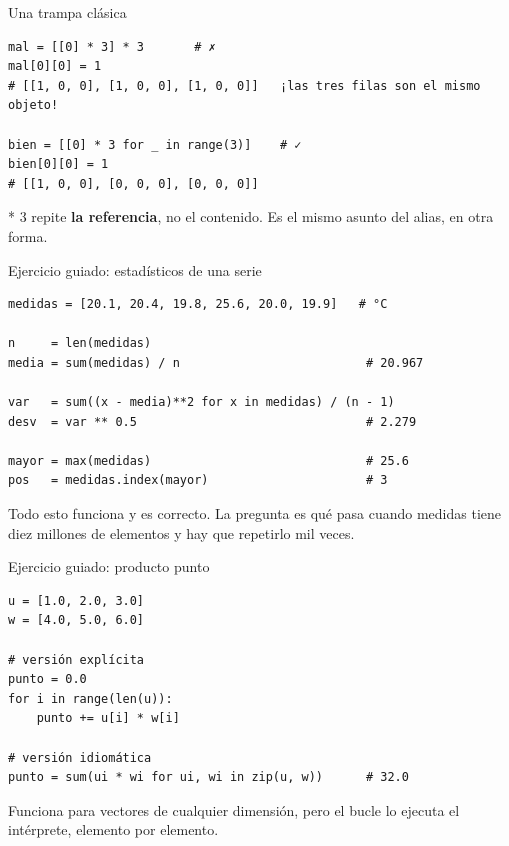 \documentclass[aspectratio=169, 11pt]{beamer}
\newcommand{\code}[1]{{\ttfamily\small\color{textoOscuro}#1}}
\begin{document}
\begin{frame}[fragile]{Una trampa clásica}
\begin{lstlisting}
mal = [[0] * 3] * 3       # ✗
mal[0][0] = 1
# [[1, 0, 0], [1, 0, 0], [1, 0, 0]]   ¡las tres filas son el mismo objeto!

bien = [[0] * 3 for _ in range(3)]    # ✓
bien[0][0] = 1
# [[1, 0, 0], [0, 0, 0], [0, 0, 0]]
\end{lstlisting}

\code{* 3} repite \textbf{la referencia}, no el contenido. Es el mismo
asunto del alias, en otra forma.
\end{frame}

\begin{frame}[fragile]{Ejercicio guiado: estadísticos de una serie}
\begin{lstlisting}
medidas = [20.1, 20.4, 19.8, 25.6, 20.0, 19.9]   # °C

n     = len(medidas)
media = sum(medidas) / n                          # 20.967

var   = sum((x - media)**2 for x in medidas) / (n - 1)
desv  = var ** 0.5                                # 2.279

mayor = max(medidas)                              # 25.6
pos   = medidas.index(mayor)                      # 3
\end{lstlisting}

Todo esto funciona y es correcto. La pregunta es qué pasa cuando
\code{medidas} tiene diez millones de elementos y hay que repetirlo mil
veces.
\end{frame}

\begin{frame}[fragile]{Ejercicio guiado: producto punto}
\begin{lstlisting}
u = [1.0, 2.0, 3.0]
w = [4.0, 5.0, 6.0]

# versión explícita
punto = 0.0
for i in range(len(u)):
    punto += u[i] * w[i]

# versión idiomática
punto = sum(ui * wi for ui, wi in zip(u, w))      # 32.0
\end{lstlisting}

Funciona para vectores de cualquier dimensión, pero el bucle lo ejecuta el
intérprete, elemento por elemento.
\end{frame}
\end{document}
